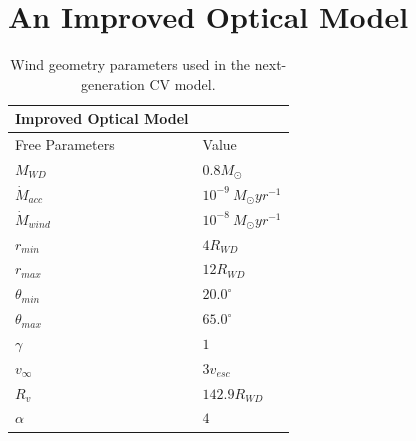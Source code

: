 \documentclass[preprint, a4paper, 11pt]{aastex}
\begin{document}
{%


%
%

\section{An Improved Optical Model }

\begin{table}
\centering
\begin{tabular}{p{3cm}p{4cm}}
Improved Optical Model \\
\hline Free Parameters 	&	 Value \\ 
\hline \hline 
$M_{WD}$ 	 &	 $0.8 M_{\odot}$ \\ 
$\dot{M}_{acc}$ 	 &	 $10^{-9}~M_{\odot}yr^{-1}$\\ 
$\dot{M}_{wind}$  &	$10^{-8}~M_{\odot}yr^{-1}$\\ 
$r_{min}$ 	&	 $4 R_{WD}$\\ 
$r_{max}$ 	&	 $12 R_{WD}$ \\ 
$\theta_{min}$ 	&	 $20.0^{\circ}$ \\ 
$\theta_{max}$ 	&	 $65.0^{\circ}$ \\ 
$\gamma$ 	&	 $1$ \\ 
$v_{\infty}$ 	&	 $3v_{esc}$ \\ 
$R_v$ 	        &	 $142.9 R_{WD}$ \\ 
$\alpha$ 	&	 $4$ \\
\end{tabular}
\centering
\caption{Wind geometry parameters used in the next-generation CV model.}
\label{modelb}
\end{table}

}
\end{document}
